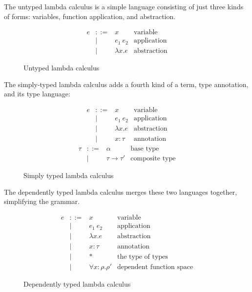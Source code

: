 \documentclass[english,zadani,odsaz]{fitthesis}
\begin{document}
The untyped lambda calculus is a simple language consisting of just three kinds
of forms: variables, function application, and abstraction.

\begin{figure}[!htpb]
\[\begin{array}{ccll}
e & ::= & x            & \text{variable} \\
  & |   & e_1~e_2      & \text{application} \\
  & |   & \lambda x. e & \text{abstraction}
\end{array}\]
\caption{Untyped lambda calculus}
\end{figure}

The simply-typed lambda calculus adds a fourth kind of a term, type annotation,
and its type language:

\begin{figure}[!htpb]
\[\begin{array}{ccll}
e & ::= & x           & \text{variable} \\
  & |   & e_1~e_2      & \text{application} \\
  & |   & \lambda x. e & \text{abstraction} \\
  & |   & x:\tau     & \text{annotation}
\end{array}\]
\[\begin{array}{ccll}
\tau & ::= & \alpha           & \text{base type} \\
     & |   & \tau\rightarrow\tau' & \text{composite type}
\end{array}\]
\caption{Simply typed lambda calculus}
\end{figure}

The dependently typed lambda calculus merges these two languages together,
simplifying the grammar.

\begin{figure}[!htpb]
\[\begin{array}{ccll}
e & ::= & x           & \text{variable} \\
  & |   & e_1~e_2      & \text{application} \\
  & |   & \lambda x. e & \text{abstraction} \\
  & |   & x:\tau      & \text{annotation} \\
  & |   & *           & \text{the type of types} \\
  & |   & \forall x:\rho.\rho' & \text{dependent function space}
\end{array}\]
\caption{Dependently typed lambda calculus}
\end{figure}
\end{document}
